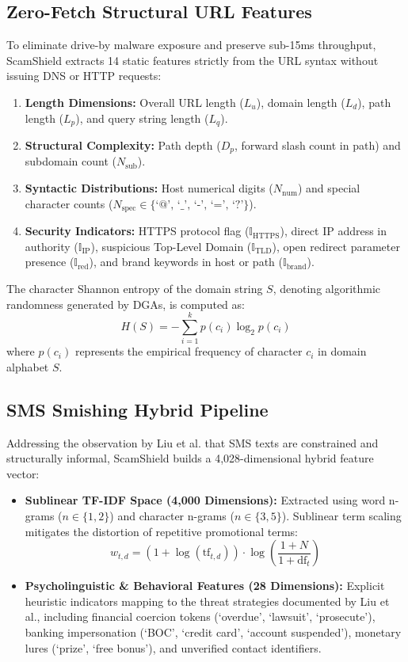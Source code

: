 \documentclass[conference]{IEEEtran}
\begin{document}
\subsection{Zero-Fetch Structural URL Features}
To eliminate drive-by malware exposure and preserve sub-15ms throughput, ScamShield extracts 14 static features strictly from the URL syntax without issuing DNS or HTTP requests:
\begin{enumerate}
    \item \textbf{Length Dimensions:} Overall URL length ($L_u$), domain length ($L_d$), path length ($L_p$), and query string length ($L_q$).
    \item \textbf{Structural Complexity:} Path depth ($D_p$, forward slash count in path) and subdomain count ($N_{\text{sub}}$).
    \item \textbf{Syntactic Distributions:} Host numerical digits ($N_{\text{num}}$) and special character counts ($N_{\text{spec}} \in \{\text{`@', `\_', `-', `=', `?'}\}$).
    \item \textbf{Security Indicators:} HTTPS protocol flag ($\mathbb{I}_{\text{HTTPS}}$), direct IP address in authority ($\mathbb{I}_{\text{IP}}$), suspicious Top-Level Domain ($\mathbb{I}_{\text{TLD}}$), open redirect parameter presence ($\mathbb{I}_{\text{red}}$), and brand keywords in host or path ($\mathbb{I}_{\text{brand}}$).
\end{enumerate}

The character Shannon entropy of the domain string $S$, denoting algorithmic randomness generated by DGAs, is computed as:
\begin{equation}
H(S) = -\sum_{i=1}^{k} p(c_i) \log_2 p(c_i)
\label{eq:entropy}
\end{equation}
where $p(c_i)$ represents the empirical frequency of character $c_i$ in domain alphabet $S$.

\subsection{SMS Smishing Hybrid Pipeline}
Addressing the observation by Liu et al. \cite{liu2021detecting} that SMS texts are constrained and structurally informal, ScamShield builds a 4,028-dimensional hybrid feature vector:
\begin{itemize}
    \item \textbf{Sublinear TF-IDF Space (4,000 Dimensions):} Extracted using word n-grams ($n \in \{1, 2\}$) and character n-grams ($n \in \{3, 5\}$). Sublinear term scaling mitigates the distortion of repetitive promotional terms:
    \begin{equation}
    w_{t,d} = (1 + \log(\text{tf}_{t,d})) \cdot \log\left(\frac{1 + N}{1 + \text{df}_t}\right)
    \label{eq:tfidf}
    \end{equation}
    \item \textbf{Psycholinguistic & Behavioral Features (28 Dimensions):} Explicit heuristic indicators mapping to the threat strategies documented by Liu et al., including financial coercion tokens (`overdue', `lawsuit', `prosecute'), banking impersonation (`BOC', `credit card', `account suspended'), monetary lures (`prize', `free bonus'), and unverified contact identifiers.
\end{itemize}
\end{document}
